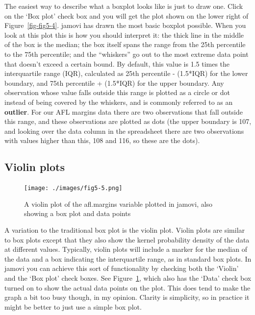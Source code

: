 \documentclass[
  letterpaper,
]{book}
\begin{document}
The easiest way to describe what a boxplot looks like is just to draw
one. Click on the `Box plot' check box and you will get the plot shown
on the lower right of Figure~\ref{fig-fig5-4}. jamovi has drawn the most
basic boxplot possible. When you look at this plot this is how you
should interpret it: the thick line in the middle of the box is the
median; the box itself spans the range from the 25th percentile to the
75th percentile; and the ``whiskers'' go out to the most extreme data
point that doesn't exceed a certain bound. By default, this value is 1.5
times the interquartile range (IQR), calculated as 25th percentile -
(1.5*IQR) for the lower boundary, and 75th percentile + (1.5*IQR) for
the upper boundary. Any observation whose value falls outside this range
is plotted as a circle or dot instead of being covered by the whiskers,
and is commonly referred to as an \textbf{outlier}. For our AFL margins
data there are two observations that fall outside this range, and these
observations are plotted as dots (the upper boundary is 107, and looking
over the data column in the spreadsheet there are two observations with
values higher than this, 108 and 116, so these are the dots).

\hypertarget{violin-plots}{%
\subsection{Violin plots}\label{violin-plots}}

\begin{figure}

\texttt{[image: ./images/fig5-5.png]} \hfill{}

\caption{\label{fig-fig5-5}A violin plot of the afl.margins variable
plotted in jamovi, also showing a box plot and data points}

\end{figure}

A variation to the traditional box plot is the violin plot. Violin plots
are similar to box plots except that they also show the kernel
probability density of the data at different values. Typically, violin
plots will include a marker for the median of the data and a box
indicating the interquartile range, as in standard box plots. In jamovi
you can achieve this sort of functionality by checking both the `Violin'
and the `Box plot' check boxes. See Figure~\ref{fig-fig5-5}, which also
has the `Data' check box turned on to show the actual data points on the
plot. This does tend to make the graph a bit too busy though, in my
opinion. Clarity is simplicity, so in practice it might be better to
just use a simple box plot.
\end{document}
